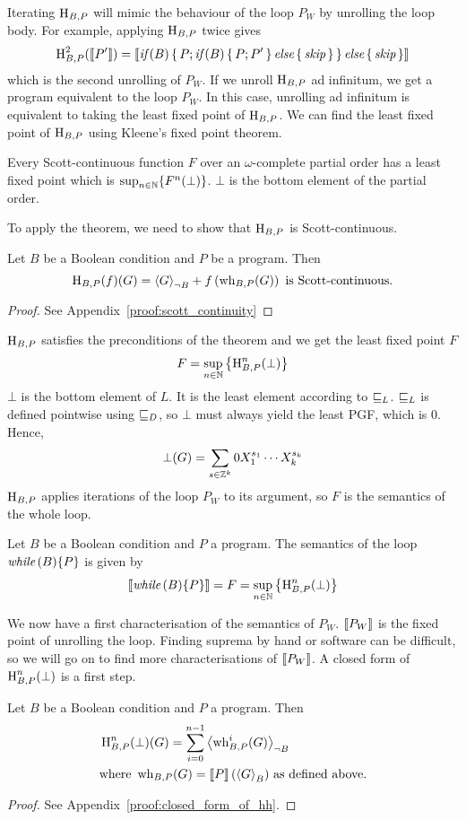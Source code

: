 Iterating $\operatorname{H}_{B, P}$ will mimic the behaviour of the loop $P_W$ by unrolling the loop body.
For example, applying $\operatorname{H}_{B, P}$ twice gives
\[ \operatorname{H}_{B, P}^2(\left\llbracket P' \right\rrbracket) = \left\llbracket  \textit{if}\,(B) \, \{ \, P; \textit{if}\,(B) \, \{ \, P; P' \, \} \, \textit{else} \, \{ \, \textit{skip} \, \} \, \} \, \textit{else} \, \{ \, \textit{skip} \, \}  \right\rrbracket \]
which is the second unrolling of $P_W$.
If we unroll $\operatorname{H}_{B, P}$ ad infinitum, we get a program equivalent to the loop $P_W$.
In this case, unrolling ad infinitum is equivalent to taking the least fixed point of $\operatorname{H}_{B, P}$.
We can find the least fixed point of $\operatorname{H}_{B, P}$ using Kleene's fixed point theorem.
\begin{theorem}
	Every Scott-continuous function $F$ over an $\omega$-complete partial order has a least fixed point which is $\sup_{n \in \mathbb{N}} \{ F^n(\bot) \}$.
	$\bot$ is the bottom element of the partial order.
\end{theorem}
To apply the theorem, we need to show that $\operatorname{H}_{B, P}$ is Scott-continuous.
\begin{lemma}[label=lem:ext:scottcontinuous]
	Let $B$ be a Boolean condition and $P$ be a program.
	Then \[ \operatorname{H}_{B, P}(f)(G) = \left\langle G \right\rangle_{\lnot B} + f \left( \operatorname{wh}_{B, P}(G) \right) \text{ is Scott-continuous.} \]
	\begin{proof}
		See Appendix~\ref{proof:scott_continuity}
	\end{proof}
\end{lemma}
$\operatorname{H}_{B, P}$ satisfies the preconditions of the theorem and we get the least fixed point $F$
\[ F = \sup_{n \in \mathbb{N}} \left\{ \operatorname{H}_{B, P}^n(\bot) \right\} \]
$\bot$ is the bottom element of $L$.
It is the least element according to $\sqsubseteq_{L}$.
$\sqsubseteq_{L}$ is defined pointwise using $\sqsubseteq_{D}$, so $\bot$ must always yield the least PGF, which is $0$.
Hence, \[ \bot(G) = \sum_{s \in \mathbb{Z}^k} 0 X_1^{s_1} \cdots X_k^{s_k} \]
$\operatorname{H}_{B, P}$ applies iterations of the loop $P_W$ to its argument,
so $F$ is the semantics of the whole loop.
\begin{definition}
	Let $B$ be a Boolean condition and $P$ a program. The semantics of the loop $\textit{while}\,(B) \{P\}$ is given by
	\[ \left\llbracket \textit{while}\,(B) \{P\} \right\rrbracket = F = \sup_{n \in \mathbb{N}} \left\{ \operatorname{H}_{B, P}^n(\bot) \right\} \]
\end{definition}
We now have a first characterisation of the semantics of $P_W$.
$\left\llbracket P_W \right\rrbracket$ is the fixed point of unrolling the loop.
Finding suprema by hand or software can be difficult, so we will go on to find more characterisations of $\left\llbracket P_W \right\rrbracket$.
A closed form of $\operatorname{H}_{B, P}^n(\bot)$ is a first step.
\begin{lemma}[label=lem:ext:closedformhh]
	Let $B$ be a Boolean condition and $P$ a program.
	Then
	\begin{align*}
		& \operatorname{H}_{B, P}^n(\bot)(G) = \sum_{i = 0}^{n-1} \left\langle \operatorname{wh}_{B, P}^i(G) \right\rangle_{\lnot B} \\
		& \text{where } \operatorname{wh}_{B, P}(G) = \left\llbracket P \right\rrbracket(\left\langle G \right\rangle_{B}) \text{ as defined above}.
	\end{align*}
	\begin{proof}
		See Appendix~\ref{proof:closed_form_of_hh}.
	\end{proof}
\end{lemma}
